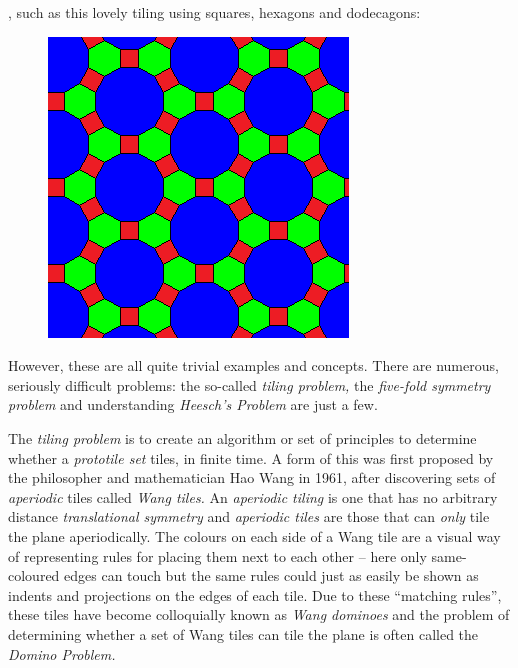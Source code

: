 , such as this lovely tiling
using squares, hexagons and dodecagons:

\begin{figure}[htbp]
\centering
\includegraphics{image_6.png}
\caption{}
\end{figure}

However, these are all quite trivial examples and concepts. There are
numerous, seriously difficult problems: the so-called \emph{tiling
problem, }the \emph{five-fold symmetry problem }and understanding
\emph{Heesch's Problem }are just a few.

The \emph{tiling problem} is to create an algorithm or set of principles
to determine whether a \emph{prototile set} tiles, in finite time. A
form of this was first proposed by the philosopher and mathematician Hao
Wang in 1961, after discovering sets of \emph{aperiodic} tiles called
\emph{Wang tiles. }An \emph{aperiodic tiling }is one that has no
arbitrary distance \emph{translational symmetry }and \emph{aperiodic
tiles }are those that can \emph{only }tile the plane aperiodically. The
colours on each side of a Wang tile are a visual way of representing
rules for placing them next to each other -- here only same-coloured
edges can touch but the same rules could just as easily be shown as
indents and projections on the edges of each tile. Due to these
``matching rules'', these tiles have become colloquially known as
\emph{Wang dominoes }and the problem of determining whether a set of
Wang tiles can tile the plane is often called the \emph{Domino Problem.}

